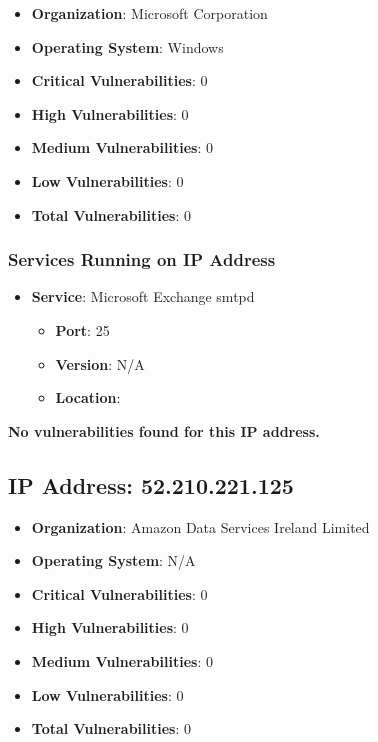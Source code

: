 \documentclass{article}
\begin{document}
\begin{itemize}
    \item \textbf{Organization}: Microsoft Corporation
    \item \textbf{Operating System}:  Windows 
    \item \textbf{Critical Vulnerabilities}: 0
    \item \textbf{High Vulnerabilities}: 0
    \item \textbf{Medium Vulnerabilities}: 0
    \item \textbf{Low Vulnerabilities}: 0
    \item \textbf{Total Vulnerabilities}: 0
\end{itemize}

\subsubsection*{Services Running on IP Address}

\begin{itemize}
    
        \item \textbf{Service}: Microsoft Exchange smtpd
        \begin{itemize}
            \item \textbf{Port}: 25
            \item \textbf{Version}:  N/A 
            \item \textbf{Location}: \href{  }{  }
        \end{itemize}
    
\end{itemize}


\textbf{No vulnerabilities found for this IP address.}




\clearpage



\subsection*{IP Address: 52.210.221.125}

\begin{itemize}
    \item \textbf{Organization}: Amazon Data Services Ireland Limited
    \item \textbf{Operating System}:  N/A 
    \item \textbf{Critical Vulnerabilities}: 0
    \item \textbf{High Vulnerabilities}: 0
    \item \textbf{Medium Vulnerabilities}: 0
    \item \textbf{Low Vulnerabilities}: 0
    \item \textbf{Total Vulnerabilities}: 0
\end{itemize}
\end{document}
